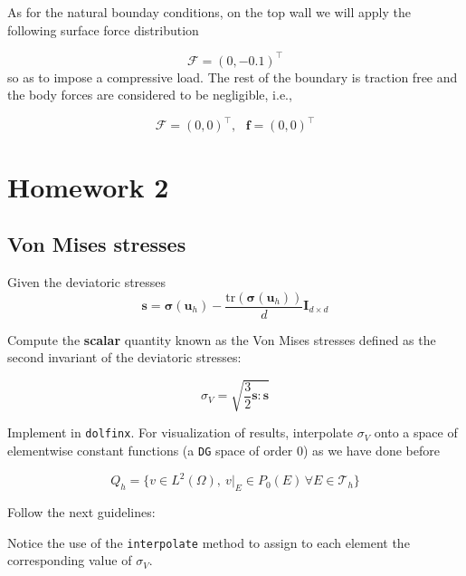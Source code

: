As for the natural bounday conditions, on the top wall we will apply 
the following surface force distribution

$$
\boldsymbol{\mathcal{F}} = (0,-0.1)^{\intercal}
$$
so as to impose a compressive load. The rest of the boundary is traction free and the body forces are considered to be negligible, i.e.,

$$
\boldsymbol{\mathcal{F}} = (0,0)^{\intercal},~~~\mathbf{f} = (0,0)^{\intercal}
$$

\section{Homework 2}

\subsection{Von Mises stresses}

Given the deviatoric stresses 
$$
\boldsymbol{s} = \boldsymbol{\sigma}(\mathbf{u}_h) - \frac{\mbox{tr}(\boldsymbol{\sigma}(\mathbf{u}_h))}{d}\boldsymbol{I}_{d\times d}
$$

Compute the \textbf{scalar} quantity known as the Von Mises stresses
defined as the second invariant of the deviatoric stresses:

$$
\sigma_V = \sqrt{\frac32\boldsymbol{s}:\boldsymbol{s}}
$$

Implement in \texttt{dolfinx}. For visualization of results, interpolate $\sigma_V$ onto a space of elementwise constant functions (a \texttt{DG} space of order 0) as we have done before

$$
Q_h = \{v \in L^2(\Omega),~v|_E \in P_0(E) \, \forall E \in \mathcal{T}_h\}
$$

Follow the next guidelines:
\vspace{-0.5cm}
\begin{center}
	\begin{minipage}{1.05\textwidth}
		
	\end{minipage}
\end{center}


Notice the use of the \texttt{interpolate} method to assign to each 
element the corresponding value of $\sigma_V$.

